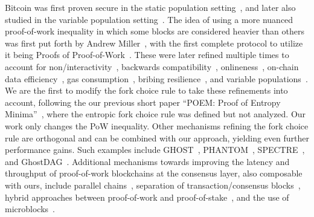 \noindent
{}
Bitcoin was first proven secure in the static population setting~\cite{backbone},
and later also studied in the variable population setting~\cite{varbackbone}.
The idea of using a more nuanced proof-of-work inequality in which some blocks
are considered heavier than others was first put forth by Andrew Miller~\cite{highway},
with the first complete protocol to utilize it being
Proofs of Proof-of-Work~\cite{popow}. These were later refined multiple times
to account for non\-/interactivity~\cite{nipopows}, backwards compatibility~\cite{velvet-nipopows},
onlineness~\cite{logspace}, on-chain data efficiency~\cite{compact-superblocks},
gas consumption~\cite{gasefficient-nipopows},
bribing resilience~\cite{soft-power},
and variable populations~\cite{dionyziz}.
We are the first to modify the fork choice rule to take these refinements into
account, following \ifanonymous
the
\else
our
\fi
previous short paper ``POEM: Proof of Entropy Minima''~\cite{poem-short},
where the entropic fork choice rule was defined but not analyzed.
Our work only changes the PoW inequality.
Other mechanisms refining the fork choice rule
are orthogonal and can be combined with our approach, yielding even
further performance gains.
Such examples include GHOST~\cite{ghost},
PHANTOM~\cite{phantom}, SPECTRE~\cite{spectre}, and GhostDAG~\cite{ghostdag}.
Additional mechanisms towards improving the latency and throughput
of proof-of-work blockchains at the consensus
layer, also composable with ours, include parallel chains~\cite{parallel-chains},
separation of transaction/consensus blocks~\cite{prism},
hybrid approaches between proof-of-work and proof-of-stake~\cite{byzcoin},
and the use of microblocks~\cite{bitcoin-ng}.